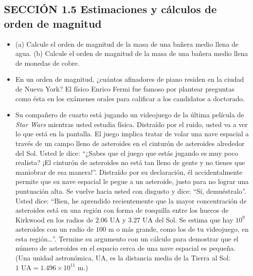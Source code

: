 \documentclass[11pt,a4paper]{article}
\begin{document}
\newpage

\subsection*{SECCIÓN 1.5 Estimaciones y cálculos de orden de magnitud}

\begin{itemize}
    \item[\textbf{17.}] (a) Calcule el orden de magnitud de la masa de una bañera medio llena de agua. (b) Calcule el orden de magnitud de la masa de una bañera medio llena de monedas de cobre.
    \vspace*{7cm}
    
    \item[\textbf{18.}] En un orden de magnitud, ¿cuántos afinadores de piano residen en la ciudad de Nueva York? El físico Enrico Fermi fue famoso por plantear preguntas como ésta en los exámenes orales para calificar a los candidatos a doctorado.
    \vspace*{8cm}
    
    \item[\textbf{19.}] Su compañero de cuarto está jugando un videojuego de la última película de \textit{Star Wars} mientras usted estudia física. Distraído por el ruido, usted va a ver lo que está en la pantalla. El juego implica tratar de volar una nave espacial a través de un campo lleno de asteroides en el cinturón de asteroides alrededor del Sol. Usted le dice: ``¿Sabes que el juego que estás jugando es muy poco realista? ¡El cinturón de asteroides no está tan lleno de gente y no tienes que maniobrar de esa manera!''. Distraído por su declaración, él accidentalmente permite que su nave espacial le pegue a un asteroide, justo para no lograr una puntuación alta. Se vuelve hacia usted con disgusto y dice: ``Sí, demuéstralo''. Usted dice: ``Bien, he aprendido recientemente que la mayor concentración de asteroides está en una región con forma de rosquilla entre los huecos de Kirkwood en los radios de $2.06 \text{ UA}$ y $3.27 \text{ UA}$ del Sol. Se estima que hay $10^9$ asteroides con un radio de $100 \text{ m}$ o más grande, como los de tu videojuego, en esta región\dots''. Termine su argumento con un cálculo para demostrar que el número de asteroides en el espacio cerca de una nave espacial es pequeña. (Una unidad astronómica, UA, es la distancia media de la Tierra al Sol: $1 \text{ UA} = 1.496 \times 10^{11} \text{ m}$.)
    \vspace*{10cm}
\end{itemize}
\end{document}
